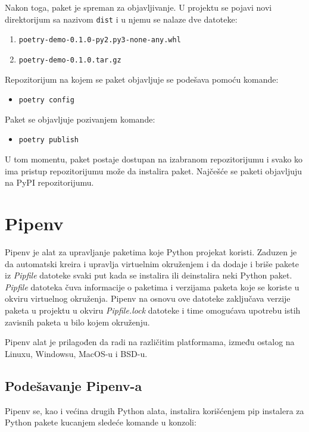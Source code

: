 \documentclass[12pt]{report}
\begin{document}
Nakon toga, paket je spreman za objavljivanje. U projektu se pojavi novi direktorijum sa nazivom \texttt{dist} i u njemu se nalaze dve datoteke:

\begin{enumerate}
    \item \texttt{poetry-demo-0.1.0-py2.py3-none-any.whl}
    \item \texttt{poetry-demo-0.1.0.tar.gz}
\end{enumerate}

Repozitorijum na kojem se paket objavljuje se podešava pomoću komande:

\begin{itemize}
    \item \texttt{poetry config}
\end{itemize}

Paket se objavljuje pozivanjem komande:

\begin{itemize}
    \item \texttt{poetry publish}
\end{itemize}

U tom momentu, paket postaje dostupan na izabranom repozitorijumu i svako ko ima pristup repozitorijumu može da instalira paket. Najčešće se paketi objavljuju na PyPI repozitorijumu.

\section{Pipenv}
Pipenv \cite{pipenv} je alat za upravljanje paketima koje Python projekat koristi. Zaduzen je da automatski kreira i upravlja virtuelnim okruženjem i da dodaje i briše pakete iz \textit{Pipfile} datoteke svaki put kada se instalira ili deinstalira neki Python paket. \textit{Pipfile} datoteka čuva informacije o paketima i verzijama paketa koje se koriste u okviru virtuelnog okruženja. Pipenv na osnovu ove datoteke zaključava verzije paketa u projektu u okviru \textit{Pipfile.lock} datoteke i time omogućava upotrebu istih zavisnih paketa u bilo kojem okruženju.

Pipenv alat je prilagođen da radi na različitim platformama, između ostalog na Linux­u, Windows­u, MacOS-u i BSD-u.

\subsection{Podešavanje Pipenv-a}

Pipenv se, kao i većina drugih Python alata, instalira korišćenjem pip instalera za Python pakete kucanjem sledeće komande u konzoli:
\end{document}

